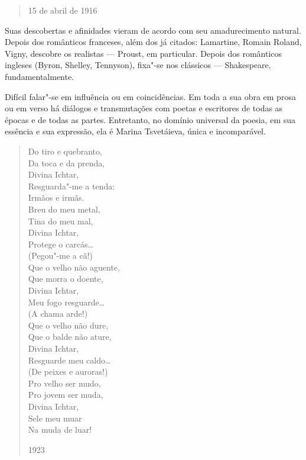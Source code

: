 {{{\begin{verse}
15 de abril de 1916

\end{verse}

Suas descobertas e afinidades vieram de acordo com seu amadurecimento
natural. Depois dos românticos franceses, além dos já citados:
Lamartine, Romain Roland, Vigny, descobre os realistas --- Proust, em
particular. Depois dos românticos ingleses (Byron, Shelley, Tennyson),
fixa"-se nos clássicos --- Shakespeare, fundamentalmente.

Difícil falar"-se em influência ou em coincidências. Em toda a sua obra
em prosa ou em verso há diálogos e transmutações com poetas e escritores
de todas as épocas e de todas as partes. Entretanto, no domínio
universal da poesia, em sua essência e sua expressão, ela é Marina
Tsvetáieva, única e incomparável.

\begin{verse}
Do tiro e quebranto, \\
Da toca e da prenda, \\
Divina Ichtar, \\
Resguarda"-me a tenda: \\[8pt]
Irmãos e irmãs. \\
Breu do meu metal, \\
Tina do meu mal, \\
Divina Ichtar, \\
Protege o carcás\ldots{} \\[8pt]
(Pegou"-me a cã!) \\[8pt]
Que o velho não aguente, \\
Que morra o doente, \\
Divina Ichtar, \\
Meu fogo resguarde\ldots{} \\[8pt]
(A chama arde!) \\[8pt]
Que o velho não dure, \\
Que o balde não ature, \\
Divina Ichtar, \\
Resguarde meu caldo\ldots{} \\[8pt]
(De peixes e auroras!) \\[8pt]
Pro velho ser mudo, \\
Pro jovem ser muda, \\
Divina Ichtar, \\
Sele meu muar \\
Na muda de luar!

1923

\end{verse}

}}}
